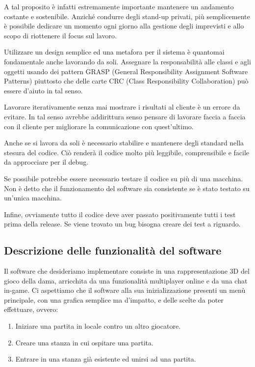 \documentclass[12pt]{article}
\begin{document}
A tal proposito è infatti estremamente importante mantenere un andamento costante e sostenibile. Anziché condurre degli stand-up privati, più semplicemente è possibile dedicare un momento ogni giorno alla gestione degli imprevisti e allo scopo di riottenere il focus sul lavoro.

Utilizzare un design semplice ed una metafora per il sistema è quantomai fondamentale anche lavorando da soli. Assegnare la responsabilità alle classi e agli oggetti usando dei pattern GRASP (General Responsibility Assignment Software Patterns) piuttosto che delle carte CRC (Class Responsibility Collaboration) può essere d'aiuto in tal senso.

Lavorare iterativamente senza mai mostrare i risultati al cliente è un errore da evitare. In tal senso avrebbe addirittura senso pensare di lavorare faccia a faccia con il cliente per migliorare la comunicazione con quest'ultimo.

Anche se si lavora da soli è necessario stabilire e mantenere degli standard nella stesura del codice. Ciò renderà il codice molto più leggibile, comprensibile e facile da approcciare per il debug.

Se possibile potrebbe essere necessario testare il codice su più di una macchina. Non è detto che il funzionamento del software sia consistente se è stato testato su un'unica macchina.

Infine, ovviamente tutto il codice deve aver passato positivamente tutti i test prima della release. Se viene trovato un bug bisogna creare dei test a riguardo.

\subsection{Descrizione delle funzionalità del software}
Il software che desideriamo implementare consiste in una rappresentazione 3D del gioco della dama, arricchita da una funzionalità multiplayer online e da una chat in-game. Ci aspettiamo che il software alla sua inizializzazione presenti un menù principale, con una grafica semplice ma d'impatto, e delle scelte da poter effettuare, ovvero:

\begin{enumerate}
\item Iniziare una partita in locale contro un altro giocatore.
\item Creare una stanza in cui ospitare una partita.
\item Entrare in una stanza già esistente ed unirsi ad una partita.
\end{enumerate}
\end{document}
